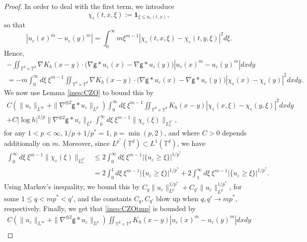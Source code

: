 \documentclass[11pt]{article}
\numberwithin{equation}{section} %
\newcommand{\T}{{\mathbb{T}}}
\newcommand{\g}{{\mathsf{g}}}
\newcommand{\nn}{\nonumber}
\newcommand{\ep}{\varepsilon}
\def \ep{\varepsilon}
\def\nab{\nabla}
\def\indic{\mathbf{1}}
\begin{document}
\begin{proof}
    In order to deal with the first term, we introduce
    \begin{equation*}
        \chi_\ep(t,x,\xi) := \indic_{\xi \le u_\ep(t,x)},
    \end{equation*}
    so that
    \begin{equation*}
        |u_\ep(x)^m-u_\ep(y)^m| = \int_0^\infty m\xi^{m-1} |\chi_\ep(t,x,\xi)-\chi_\ep(t,y,\xi)|^2d\xi.
    \end{equation*}
    Hence,
    \begin{multline*}
        -\iint_{\T^d\times\T^d} \nab K_h(x-y)\cdot \big(\nab\g\ast u_\ep(x) - \nab\g\ast u_\ep(y)\big)  |u_\ep(x)^m-u_\ep(y)^m| dxdy\\
        = -m\int_0^\infty d\xi \ \xi^{m-1}\iint_{\T^d\times\T^d} \nab K_h(x-y)\cdot \big(\nab\g\ast u_\ep(x) - \nab\g\ast u_\ep(y)\big)  |\chi_\ep(x)-\chi_\ep(y)|^2dxdy.
    \end{multline*}
    We now use Lemma \ref{ineq:CZO} to bound this by
    \begin{multline}\label{ineq:CZOtmp}
        C(\|u_\ep\|_{L^\infty} + \|\nab^{\otimes 2}\g\ast u_\ep\|_{L^p})\int_0^\infty d\xi \ \xi^{m-1} \iint_{\T^d\times \T^d}K_h(x-y) |\chi_\ep(x,\xi)-\chi_\ep(y,\xi)|^2 dxdy  \\
        + C |\log h|^{1/\bar p} \|\nab^{\otimes 2}\g\ast u_\ep\|_{L^p} \int_0^\infty d\xi \ \xi^{m-1} \|\chi_\ep(\xi)\|_{L^{p^*}_x},
    \end{multline}
    for any $1<p<\infty$, $ 1/{p}+1/{p^*} = 1$, $\bar p = \min(p,2)$, and where $C>0$ depends additionally on $m$. Moreover, since $L^{p^*}(\T^d)\subset L^1(\T^d)$, we have
    \begin{align}\label{ineq:chiLp}
        \int_0^\infty d\xi \ \xi^{m-1} \|\chi_\ep(\xi)\|_{L^{p^*}_x} &\le 2\int_0^\infty d\xi \ \xi^{m-1} |\{u_\ep\ge \xi\}|^{1/p^*} \nn \\
        &=2\int_0^1 d\xi\ \xi^{m-1}|\{ u_\ep\ge\xi \}|^{1/p^*} +2\int_1^\infty d\xi\ \xi^{m-1}|\{ u_\ep\ge\xi \}|^{1/p^*}.
    \end{align}
    Using Markov's inequality, we bound this by
        $C_q \|u_\ep\|_{L^q}^{1/p^*} + C_{q'}\|u_\ep\|_{L^{q'}}^{1/p^*}$,
    for some $1\le q< mp^*<q'$, and the constants $C_q,C_{q'}$ blow up when $q,q'\to mp^*$, respectively. Finally, we get that \eqref{ineq:CZOtmp} is bounded by
    \begin{multline*}
        C(\|u_\ep\|_{L^\infty} + \|\nab^{\otimes 2}\g\ast u_\ep\|_{L^p}) \iint_{\T^d\times \T^d}K_h(x-y) |u_\ep(x)^m-u_\ep(y)^m| dxdy  \\

\end{multline*}
\end{proof}
\end{document}
